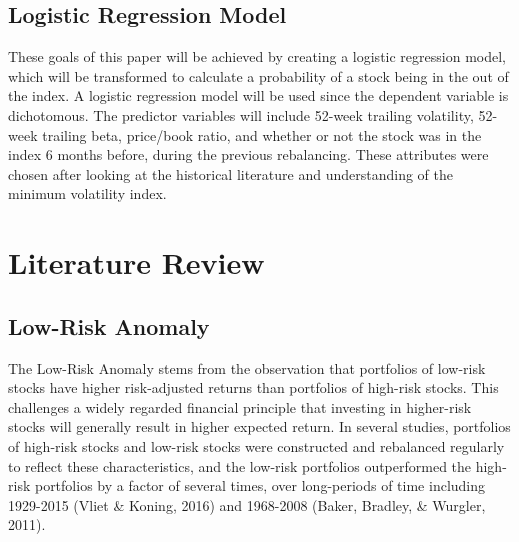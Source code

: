 \documentclass[12pt,twoside]{reedthesis}
\theoremstyle{definition}
\theoremstyle{definition}
\theoremstyle{definition}
\theoremstyle{remark}
\begin{document}
\subsection{Logistic Regression Model}\label{logistic-regression-model}

These goals of this paper will be achieved by creating a logistic
regression model, which will be transformed to calculate a probability
of a stock being in the out of the index. A logistic regression model
will be used since the dependent variable is dichotomous. The predictor
variables will include 52-week trailing volatility, 52-week trailing
beta, price/book ratio, and whether or not the stock was in the index 6
months before, during the previous rebalancing. These attributes were
chosen after looking at the historical literature and understanding of
the minimum volatility index.

\section{Literature Review}\label{literature-review}

\subsection{Low-Risk Anomaly}\label{low-risk-anomaly}

The Low-Risk Anomaly stems from the observation that portfolios of
low-risk stocks have higher risk-adjusted returns than portfolios of
high-risk stocks. This challenges a widely regarded financial principle
that investing in higher-risk stocks will generally result in higher
expected return. In several studies, portfolios of high-risk stocks and
low-risk stocks were constructed and rebalanced regularly to reflect
these characteristics, and the low-risk portfolios outperformed the
high-risk portfolios by a factor of several times, over long-periods of
time including 1929-2015 (Vliet \& Koning, 2016) and 1968-2008 (Baker,
Bradley, \& Wurgler, 2011).
\end{document}
